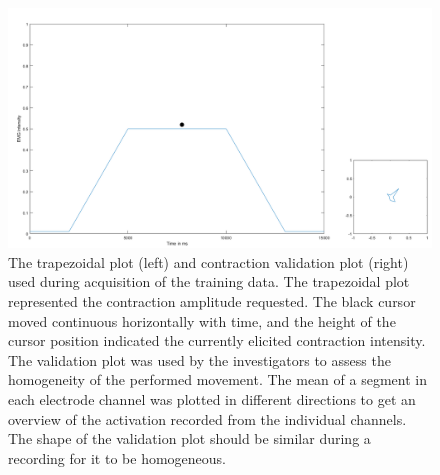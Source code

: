\begin{figure}[H]                 
	\includegraphics[width=1\textwidth]{figures/trapezoid}  
	\caption{The trapezoidal plot (left) and contraction validation plot (right) used during acquisition of the training data. The trapezoidal plot represented the contraction amplitude requested. The black cursor moved continuous horizontally with time, and the height of the cursor position indicated the currently elicited contraction intensity. The validation plot was used by the investigators to assess the homogeneity of the performed movement. The mean of a segment in each electrode channel was plotted in different directions to get an overview of the activation recorded from the individual channels. The shape of the validation plot should be similar during a recording for it to be homogeneous.}
	\label{fig:GUI} 
\end{figure}
\vspace{-1em}

